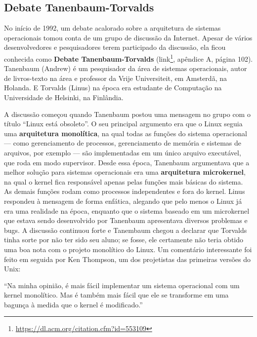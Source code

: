 \documentclass[
  11pt,
  twoside]{book}
\DeclareRobustCommand{\href}[2]{#2\footnote{\url{#1}}}
\renewenvironment{quote}{\centering \vspace{1.5ex} \begin{tcolorbox}[colback=backcolor, width=4.9in]}{\end{tcolorbox}}
\begin{document}
\hypertarget{debate-tanenbaum-torvalds}{%
\subsection{Debate Tanenbaum-Torvalds}\label{debate-tanenbaum-torvalds}}

 
 No início de 1992, um debate acalorado sobre a
arquitetura de sistemas operacionais tomou conta de um grupo de
discussão da Internet. Apesar de vários desenvolvedores e pesquisadores
terem participado da discussão, ela ficou conhecida como \textbf{Debate
Tanenbaum-Torvalds}
(\href{https://dl.acm.org/citation.cfm?id=553109}{link}, apêndice A,
página 102). Tanenbaum (Andrew) é um pesquisador da área de sistemas
operacionais, autor de livros-texto na área e professor da Vrije
Universiteit, em Amsterdã, na Holanda. E Torvalds (Linus) na época era
estudante de Computação na Universidade de Helsinki, na Finlândia.

   A discussão começou
quando Tanenbaum postou uma mensagem no grupo com o título ``Linux está
obsoleto''. O seu principal argumento era que o Linux seguia uma
\textbf{arquitetura monolítica}, na qual todas as funções do sistema
operacional --- como gerenciamento de processos, gerenciamento de
memória e sistemas de arquivos, por exemplo --- são implementadas em um
único arquivo executável, que roda em modo supervisor. Desde essa época,
Tanenbaum argumentava que a melhor solução para sistemas operacionais
era uma \textbf{arquitetura microkernel}, na qual o kernel fica
responsável apenas pelas funções mais básicas do sistema. As demais
funções rodam como processos independentes e fora do kernel. Linus
respondeu à mensagem de forma enfática, alegando que pelo menos o Linux
já era uma realidade na época, enquanto que o sistema baseado em um
microkernel que estava sendo desenvolvido por Tanenbaum apresentava
diversos problemas e bugs. A discussão continuou forte e Tanembaum
chegou a declarar que Torvalds tinha sorte por não ter sido seu aluno;
se fosse, ele certamente não teria obtido uma boa nota com o projeto
monolítico do Linux. Um comentário interessante foi feito em seguida por
Ken Thompson, um dos projetistas das primeiras versões do Unix:

\begin{quote}
``Na minha opinião, é mais fácil implementar um sistema operacional com
um kernel monolítico. Mas é também mais fácil que ele se transforme em
uma bagunça à medida que o kernel é modificado.''
\end{quote}
\end{document}
